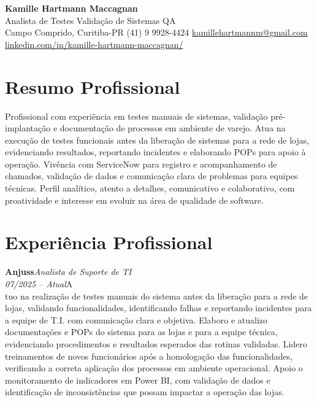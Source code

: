 \documentclass[11pt,a4paper]{article}
\newcommand{\cvrole}[4]{%
  \vspace{4pt}%
  {\bfseries\color{accentcolor}#1}\hfill{\itshape #2}\\[-2pt]%
  {\itshape #3}\hfill #4\\[6pt]%
}
\begin{document}
\begin{center}
  {\fontsize{20}{24}\selectfont\bfseries Kamille Hartmann Maccagnan}\\[8pt]
  {\large Analista de Testes \textbar{} Validação de Sistemas \textbar{} QA}\\[10pt]
  Campo Comprido, Curitiba-PR \enspace\textbullet\enspace (41) 9 9928-4424 \enspace\textbullet\enspace
  \href{mailto:kamillehartmannm@gmail.com}{kamillehartmannm@gmail.com}\\[3pt]
  \href{https://linkedin.com/in/kamille-hartmann-maccagnan/}{linkedin.com/in/kamille-hartmann-maccagnan/}
\end{center}

\vspace{6pt}

\section{Resumo Profissional}

Profissional com experiência em testes manuais de sistemas, validação pré-implantação e documentação de processos em ambiente de varejo. Atua na execução de testes funcionais antes da liberação de sistemas para a rede de lojas, evidenciando resultados, reportando incidentes e elaborando POPs para apoio à operação. Vivência com ServiceNow para registro e acompanhamento de chamados, validação de dados e comunicação clara de problemas para equipes técnicas. Perfil analítico, atento a detalhes, comunicativo e colaborativo, com proatividade e interesse em evoluir na área de qualidade de software.

\section{Experiência Profissional}

\cvrole{Anjuss}{Analista de Suporte de TI}{07/2025 -- Atual}

Atuo na realização de testes manuais do sistema antes da liberação para a rede de lojas, validando funcionalidades, identificando falhas e reportando incidentes para a equipe de T.I. com comunicação clara e objetiva. Elaboro e atualizo documentações e POPs do sistema para as lojas e para a equipe técnica, evidenciando procedimentos e resultados esperados das rotinas validadas. Lidero treinamentos de novos funcionários após a homologação das funcionalidades, verificando a correta aplicação dos processos em ambiente operacional. Apoio o monitoramento de indicadores em Power BI, com validação de dados e identificação de inconsistências que possam impactar a operação das lojas.
\end{document}
